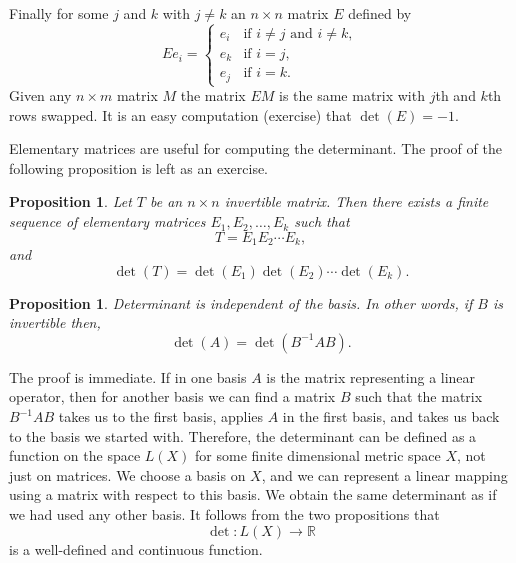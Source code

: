 \documentclass[12pt]{book}
\newcommand{\R}{{\mathbb{R}}}
\theoremstyle{plain}
\newtheorem{prop}[thm]{Proposition}
\theoremstyle{remark}
\theoremstyle{definition}
\theoremstyle{exercise}
\theoremstyle{example}
\begin{document}
Finally for some $j$ and $k$ with $j\neq k$ an
$n \times n$ matrix $E$ defined by
\begin{equation*}
Ee_i = 
\begin{cases}
e_i & \text{if $i \neq j$ and $i \neq k$} , \\
e_k & \text{if $i = j$} , \\
e_j & \text{if $i = k$} .
\end{cases}
\end{equation*}
Given any $n \times m$ matrix $M$ the matrix $EM$ is the same matrix with
$j$th and $k$th rows swapped.
It is an easy computation (exercise) that $\det(E) = -1$.

Elementary matrices are useful for computing the determinant.
The proof of the following proposition is left as an exercise.

\begin{prop} \label{prop:elemmatrixdecomp}
Let $T$ be an $n \times n$ invertible matrix.  Then there exists a finite
sequence of elementary matrices $E_1, E_2, \ldots, E_k$ such that
\begin{equation*}
T = E_1 E_2 \cdots E_k ,
\end{equation*}
and
\begin{equation*}
\det(T) = \det(E_1)\det(E_2)\cdots \det(E_k) .
\end{equation*}
\end{prop}

\begin{prop}
Determinant is independent of the basis.  In other words, if $B$ is invertible
then,
\begin{equation*}
\det(A) = \det(B^{-1}AB) .
\end{equation*}
\end{prop}

The proof is immediate.  If in one basis $A$ is the matrix representing a
linear operator, then for another basis we can find a matrix $B$ such
that the matrix $B^{-1}AB$ takes us to the first basis, applies $A$ in the
first basis, and takes us back to the basis we started with.
Therefore, the determinant can be defined as a function on the
space $L(X)$ for some finite dimensional metric space $X$, 
not just on matrices.
We choose a basis on $X$, and we can represent a linear mapping using
a matrix with respect to this basis.  We obtain the
same determinant as if we had used any other basis.
It follows from the two propositions that
\begin{equation*}
\det \colon L(X) \to \R
\end{equation*}
is a well-defined and continuous function.
\end{document}
